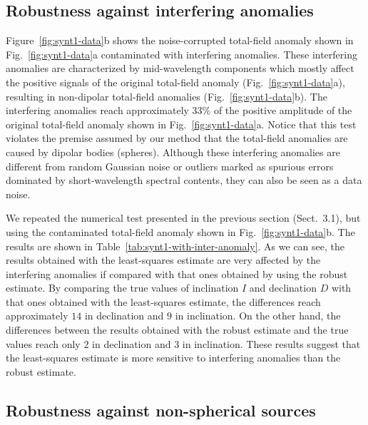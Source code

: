 \documentclass[journal abbreviation, npg]{copernicus}
\begin{document}
\subsection{Robustness against interfering anomalies}

Figure~\ref{fig:synt1-data}b shows the noise-corrupted total-field
anomaly shown in Fig.~\ref{fig:synt1-data}a contaminated with
interfering anomalies. These interfering anomalies are characterized
by mid-wavelength components which mostly affect the positive signals
of the original total-field anomaly (Fig.~\ref{fig:synt1-data}a),
resulting in non-dipolar total-field anomalies
(Fig.~\ref{fig:synt1-data}b). The interfering anomalies reach
approximately $33 \%$ of the positive amplitude of the original
total-field anomaly shown in Fig.~\ref{fig:synt1-data}a. 
Notice that this test violates the
premise assumed by our method that the total-field anomalies are
caused by dipolar bodies (spheres). Although these interfering
anomalies are different from random Gaussian noise or outliers marked
as spurious errors dominated by short-wavelength spectral contents,
they can also be seen as a data noise.

We repeated the numerical test presented in the previous section (Sect.~3.1),
but using the contaminated total-field anomaly shown in
Fig.~\ref{fig:synt1-data}b. The results are shown in
Table~\ref{tab:synt1-with-inter-anomaly}. As we can see, the results obtained
with the least-squares estimate are very affected by the interfering
anomalies if compared with that ones obtained by using the robust estimate.
By comparing the true values of inclination $I$ and declination $D$ with that
ones obtained with the least-squares estimate, the differences reach
approximately $14${\degree} in declination and $9${\degree} in inclination.
On the other hand, the differences between the results obtained with the
robust estimate and the true values reach only $2${\degree} in declination
and $3${\degree} in inclination. These results suggest that the least-squares
estimate is more sensitive to interfering anomalies than the robust estimate.

\subsection{Robustness against non-spherical sources}
\end{document}

